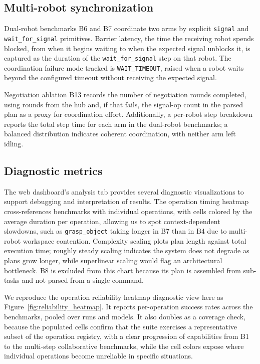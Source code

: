 \subsection{Multi-robot synchronization}
Dual-robot benchmarks B6 and B7 coordinate two arms by explicit \texttt{signal} and \texttt{wait\_for\_signal} primitives. Barrier latency, the time the receiving robot spends blocked, from when it begins waiting to when the expected signal unblocks it, is captured as the duration of the \texttt{wait\_for\_signal} step on that robot. The coordination failure mode tracked is \texttt{WAIT\_TIMEOUT}, raised when a robot waits beyond the configured timeout without receiving the expected signal.

Negotiation ablation B13 records the number of negotiation rounds completed, using rounds from the hub and, if that fails, the signal-op count in the parsed plan as a proxy for coordination effort. Additionally, a per-robot step breakdown reports the total step time for each arm in the dual-robot benchmarks; a balanced distribution indicates coherent coordination, with neither arm left idling.

\subsection{Diagnostic metrics}
The web dashboard’s analysis tab provides several diagnostic visualizations to support debugging and interpretation of results. The operation timing heatmap cross-references benchmarks with individual operations, with cells colored by the average duration per operation, allowing us to spot context-dependent slowdowns, such as \texttt{grasp\_object} taking longer in B7 than in B4 due to multi-robot workspace contention. Complexity scaling plots plan length against total execution time; roughly steady scaling indicates the system does not degrade as plans grow longer, while superlinear scaling would flag an architectural bottleneck. B8 is excluded from this chart because its plan is assembled from sub-tasks and not parsed from a single command.

We reproduce the operation reliability heatmap diagnostic view here as Figure~\ref{fig:reliability_heatmap}. It reports per-operation success rates across the benchmarks, pooled over runs and models. It also doubles as a coverage check, because the populated cells confirm that the suite exercises a representative subset of the operation registry, with a clear progression of capabilities from B1 to the multi-step collaborative benchmarks, while the cell colors expose where individual operations become unreliable in specific situations.

